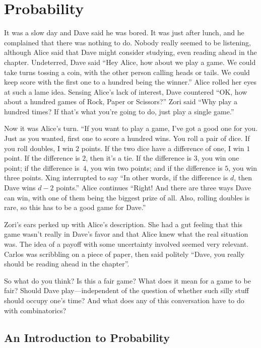
\chapter{Probability}\label{ch:probability}

It was a slow day and Dave said he was bored.  It was just after lunch,
and he complained that there was nothing to do.  Nobody really seemed
to be listening, although Alice said that Dave might consider
studying, even reading ahead in the chapter.  Undeterred, Dave said
``Hey Alice, how about we play a game.  We could take turns tossing a
coin, with the other person calling heads or tails.  We could keep
score with the first one to a hundred being the winner.''  Alice
rolled her eyes at such a lame idea.  Sensing Alice's lack of
interest, Dave countered ``OK, how about a hundred games of Rock, Paper
or Scissors?''  Zori said ``Why play a hundred times?  If that's what
you're going to do, just play a single game.''

Now it was Alice's turn.  ``If you want to play a game, I've got a
good one for you.  Just as you wanted, first one to score a hundred
wins.  You roll a pair of dice.  If you roll doubles, I win $2$
points.  If the two dice have a difference of one, I win $1$ point.
If the difference is $2$, then it's a tie.  If the difference is $3$,
you win one point; if the difference is~$4$, you win two points; and if
the difference is $5$, you win three points.  Xing interrupted to say
``In other words, if the difference is $d$, then Dave wins $d-2$
points.''  Alice continues ``Right!  And there are three ways Dave can
win, with one of them being the biggest prize of all.  Also, rolling
doubles is rare, so this has to be a good game for Dave.''

Zori's ears perked up with Alice's description.  She had a gut feeling
that this game wasn't really in Dave's favor and that Alice knew what
the real situation was.  The idea of a payoff with some
uncertainty involved seemed very relevant.  Carlos was scribbling on a piece of paper,
then said politely ``Dave, you really should be reading ahead in the
chapter''.

So what do you think?  Is this a fair game?  What does it mean for a
game to be fair?  Should Dave play---independent of the question of
whether such silly stuff should occupy one's time?  And what does any
of this conversation have to do with combinatorics?

\section{An Introduction to Probability}

